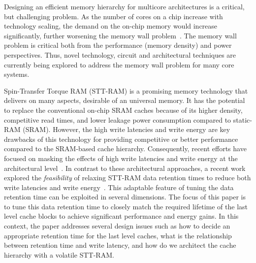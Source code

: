 
Designing an efficient memory hierarchy for multicore architectures is a critical, but challenging
problem. As the number of cores on a chip increase with technology scaling, the demand on the on-chip
memory would increase significantly, further worsening the memory wall problem~\cite{BurgerGK96}. The
memory wall problem is critical both from the performance (memory density) and power perspectives.
Thus, novel technology, circuit and architectural techniques are currently being explored to address
the memory wall problem for many core systems.




Spin-Transfer Torque RAM (STT-RAM) is a promising memory technology that delivers on many aspects,
desirable of an universal memory. It has the potential to replace the conventional on-chip SRAM
caches because of its higher density, competitive read times, and lower leakage power consumption
compared to static-RAM (SRAM). However, the high write latencies and write energy are key drawbacks
of this technology for providing competitive or better performance compared to the SRAM-based cache
hierarchy. Consequently, recent efforts have focused on masking the effects of high write latencies
and write energy at the architectural level~\cite{mram-energy-reduction,gsun-hpca}. In contrast to
these architectural approaches, a recent  work explored the {\it feasibility} of relaxing STT-RAM
data retention times to reduce both write latencies and write energy~\cite{STTRAM:HPCA11}. This
adaptable feature of tuning the data retention time can be exploited in several dimensions. The focus
of this paper is to tune this data retention time to closely match the required lifetime of the last
level cache blocks to achieve significant performance and energy gains. In this context, the paper
addresses several design issues such as how to decide an appropriate retention time for the last
level caches, what is the relationship between retention time and write latency, and how do we
architect the cache hierarchy with a volatile STT-RAM.

